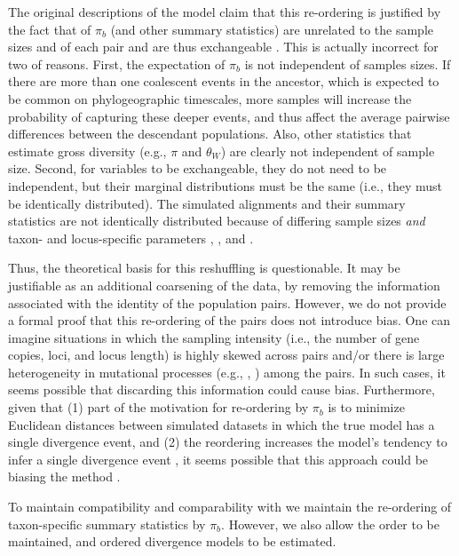 The original descriptions of the \msb model claim that this re-ordering is
justified by the fact that of $\pi_b$ (and other summary statistics) are
unrelated to the sample sizes  and  of
each pair and are thus exchangeable \citep{Hickerson2006,Huang2011}.
This is actually incorrect for two of reasons.
First, the expectation of $\pi_b$ is not independent of samples sizes.
If there are more than one coalescent events in the ancestor, which is expected
to be common on phylogeographic timescales, more samples will increase the
probability of capturing these deeper events, and thus affect the average
pairwise differences between the descendant populations.
Also, other statistics that estimate gross diversity (e.g., $\pi$ and
$\theta_W$) are clearly not independent of sample size.
Second, for variables to be exchangeable, they do not need to be independent,
but their marginal distributions must be the same (i.e., they must be
identically distributed).
The simulated alignments and their summary statistics are not identically
distributed because of differing sample sizes \emph{and} taxon- and
locus-specific parameters \hkyModel{}{}, \mutationRateScalarConstant{}{}, and
\ploidyScalar{}{}.

Thus, the theoretical basis for this reshuffling is questionable.
It may be justifiable as an additional coarsening of the data,
by removing the information associated with the identity of the
population pairs.
However, we do not provide a formal proof that this re-ordering of the pairs
does not introduce bias.
One can imagine situations in which the sampling intensity (i.e., the
number of gene copies, loci, and locus length) is highly skewed across
pairs and/or there is large heterogeneity in mutational processes
(e.g., \hkyModel{}{}, \mutationRateScalarConstant{}{}) among the pairs.
In such cases, it seems possible that discarding this information could
cause bias.
Furthermore, given that (1) part of the motivation for re-ordering by $\pi_b$
is to minimize Euclidean distances between simulated datasets in which the true
model has a single divergence event, and (2) the reordering increases the
model's tendency to infer a single divergence event \citep{Huang2011}, it seems
possible that this approach could be biasing the method \citep{Oaks2012}.

To maintain compatibility and comparability with \msb we maintain
the re-ordering of taxon-specific summary statistics by $\pi_b$.
However, we also allow the order to be maintained, and ordered
divergence models to be estimated.

